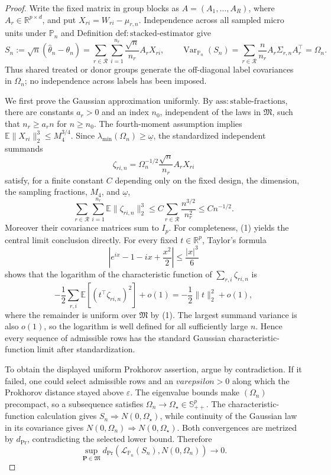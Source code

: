 \documentclass{article}
\begin{document}
\begin{proof}
Write the fixed matrix in group blocks as \(A=(A_1,\ldots,A_R)\), where \(A_r\in\mathbb R^{p\times d}\), and put \(X_{ri}=W_{ri}-\mu_{r,n}\).  Independence across all sampled micro units under \(\mathbb P_n\) and Definition \(\mathrm{def:stacked\text{-}estimator}\) give
\[
 S_n:=\sqrt n(\widehat\theta_n-\theta_n)
 =\sum_{r\in\mathcal R}\sum_{i=1}^{n_r}
     \frac{\sqrt n}{n_r}A_rX_{ri},
\qquad
 \operatorname{Var}_{\mathbb P_n}(S_n)
 =\sum_{r\in\mathcal R}\frac n{n_r}A_r\Sigma_{r,n}A_r^{\top}
 =\Omega_n.
\]
Thus shared treated or donor groups generate the off-diagonal label covariances in \(\Omega_n\); no independence across labels has been imposed.

We first prove the Gaussian approximation uniformly.  By \(\mathrm{ass:stable\text{-}fractions}\), there are constants \(a_r>0\) and an index \(n_0\), independent of the laws in \(\mathfrak M\), such that \(n_r\ge a_rn\) for \(n\ge n_0\).  The fourth-moment assumption implies
\(
 \mathbb E\|X_{ri}\|_2^3\le M_4^{3/4}
\).
Since \(\lambda_{\min}(\Omega_n)\ge\underline\omega\), the standardized independent summands
\[
 \zeta_{ri,n}=\Omega_n^{-1/2}\frac{\sqrt n}{n_r}A_rX_{ri}
\]
satisfy, for a finite constant \(C\) depending only on the fixed design, the dimension, the sampling fractions, \(M_4\), and \(\underline\omega\),
\[
 \sum_{r\in\mathcal R}\sum_{i=1}^{n_r}
   \mathbb E\|\zeta_{ri,n}\|_2^3
 \le C\sum_{r\in\mathcal R}\frac{n^{3/2}}{n_r^2}
 \le Cn^{-1/2}.
\tag{1}
\]
Moreover their covariance matrices sum to \(I_p\).  For completeness, (1) yields the central limit conclusion directly.  For every fixed \(t\in\mathbb R^p\), Taylor's formula
\[
 \left|e^{ix}-1-ix+\frac{x^2}{2}\right|\le\frac{|x|^3}{6}
\]
shows that the logarithm of the characteristic function of
\(\sum_{r,i}\zeta_{ri,n}\) is
\[
 -\frac12\sum_{r,i}\mathbb E[(t^{\top}\zeta_{ri,n})^2]+o(1)
 =-\frac12\|t\|_2^2+o(1),
\]
where the remainder is uniform over \(\mathfrak M\) by (1).  The largest summand variance is also \(o(1)\), so the logarithm is well defined for all sufficiently large \(n\).  Hence every sequence of admissible rows has the standard Gaussian characteristic-function limit after standardization.

To obtain the displayed uniform Prokhorov assertion, argue by contradiction.  If it failed, one could select admissible rows and an \(varepsilon>0\) along which the Prokhorov distance stayed above \(\varepsilon\).  The eigenvalue bounds make \((\Omega_n)\) precompact, so a subsequence satisfies \(\Omega_n\to\Omega_{\star}\in\mathbb S_{++}^p\).  The characteristic-function calculation gives \(S_n\Rightarrow N(0,\Omega_{\star})\), while continuity of the Gaussian law in its covariance gives \(N(0,\Omega_n)\Rightarrow N(0,\Omega_{\star})\).  Both convergences are metrized by \(d_{\mathrm{Pr}}\), contradicting the selected lower bound.  Therefore
\[
 \sup_{\mathbf P\in\mathfrak M}
 d_{\mathrm{Pr}}\!\left(\mathcal L_{\mathbb P_n}(S_n),N(0,\Omega_n)\right)
 \longrightarrow0.
\]


\end{proof}
\end{document}
